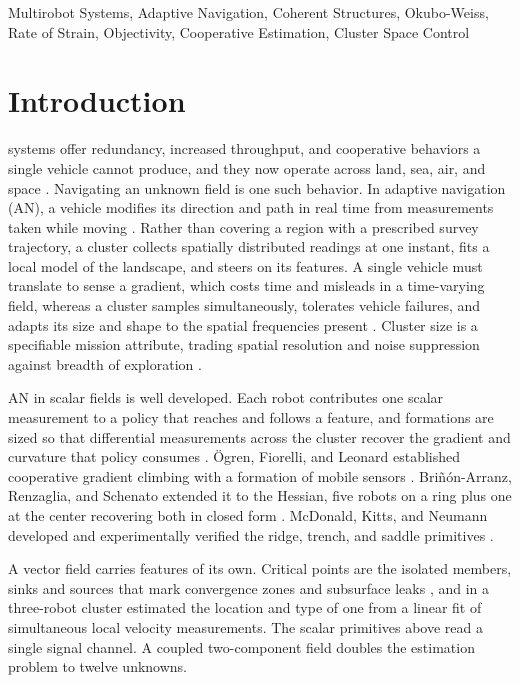 \documentclass[lettersize,journal]{IEEEtran}
\begin{document}
\begin{IEEEkeywords}
Multirobot Systems, Adaptive Navigation, Coherent Structures,
Okubo-Weiss, Rate of Strain, Objectivity, Cooperative
Estimation, Cluster Space Control
\end{IEEEkeywords}

\section{Introduction}

 systems offer redundancy, increased
throughput, and cooperative behaviors a single vehicle cannot produce,
and they now operate across land, sea, air, and space \cite{1}.
Navigating an unknown field is one such behavior. In adaptive
navigation (AN), a vehicle modifies its direction and path in real time
from measurements taken while moving \cite{2}. Rather than covering a region with a prescribed survey trajectory, a
cluster collects spatially distributed readings at one instant, fits a
local model of the landscape, and steers on its features. A single vehicle must translate to sense a
gradient, which costs time and misleads in a time-varying field,
whereas a cluster samples simultaneously, tolerates vehicle failures,
and adapts its size and shape to the spatial frequencies present
\cite{2,3}. Cluster size is a specifiable mission attribute, trading
spatial resolution and noise suppression against breadth of exploration
\cite{4}.

AN in scalar fields is well developed. Each
robot contributes one scalar measurement to a policy that reaches and
follows a feature, and formations are sized so that differential
measurements across the cluster recover the gradient and curvature that
policy consumes \cite{4,5}. \"{O}gren, Fiorelli, and Leonard
established cooperative gradient climbing with a formation of mobile
sensors \cite{5}. Bri\~{n}\'{o}n-Arranz, Renzaglia, and Schenato
extended it to the Hessian, five robots on a ring plus one at the
center recovering both in closed form \cite{4}. McDonald, Kitts, and
Neumann developed and experimentally verified the ridge, trench, and
saddle primitives \cite{2,3,6}.

A vector field carries features of its own. Critical points are
the isolated members, sinks and sources that mark convergence zones and
subsurface leaks \cite{7}, and in \cite{8} a three-robot cluster
estimated the location and type of one from a linear fit of
simultaneous local velocity measurements. The scalar primitives above
read a single signal channel. A coupled two-component field doubles the
estimation problem to twelve unknowns.
\end{document}
